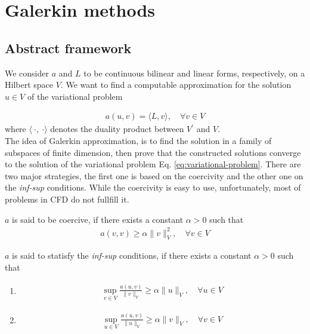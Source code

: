 \chapter{Galerkin methods}
\label{ch:fem-abstract}
\section{Abstract framework}
We consider $a$ and $L$ to be continuous bilinear and linear forms, respectively, on a Hilbert space $V$.
We want to find a computable approximation for the solution $u \in V$ of the variational problem

\begin{align}
  a(u,v) = \langle L, v \rangle, \quad \forall v \in V
  \label{eq:variational-problem}
\end{align}
where $\langle ~\cdot, ~\cdot \rangle$ denotes the duality product between $V^\prime$ and $V$.
\\
The idea of Galerkin approximation, is to find the solution in a family of subspaces of finite dimension, then prove that the constructed solutions converge to the solution of the variational problem Eq. \eqref{eq:variational-problem}. There are two major strategies, the first one is based on the coercivity and the other one on the \textit{inf-sup} conditions. While the coercivity is easy to use, unfortunately, most of problems in CFD do not fullfill it.
%
\begin{definition}
 $a$ is said to be coercive, if there exists a constant $\alpha > 0$ such that
 \begin{align}
   a(v,v) \geq \alpha \| v \|^2_V, \quad \forall v \in V
   \label{eq:coercivity}
 \end{align}
\end{definition}
%
\begin{definition}
  $a$ is said to statisfy the \textit{inf-sup} conditions, if there exists a constant $\alpha > 0$ such that
  \begin{enumerate}
    \item 
     \begin{align}
       \sup\limits_{v \in V} \frac{a(u,v)}{\| v \|_V} \geq \alpha \| u \|_V, \quad \forall u \in V
       \label{eq:infsup-1}
     \end{align}
    \item 
     \begin{align}
       \sup\limits_{u \in V} \frac{a(u,v)}{\| u \|_V} \geq \alpha \| v \|_V, \quad \forall v \in V
       \label{eq:infsup-2}
     \end{align}
  \end{enumerate}
\end{definition}
